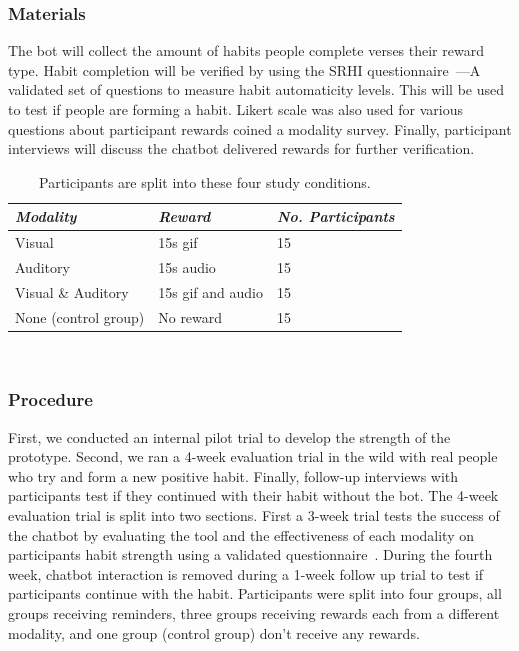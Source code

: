 \documentclass{scaffold/sigchi}
\begin{document}
\subsubsection{Materials}
The bot will collect the amount of habits people complete verses their reward type. Habit completion will be verified by using the SRHI questionnaire~\cite{article_habit_measurement}---A validated set of questions to measure habit automaticity levels. This will be used to test if people are forming a habit. Likert scale was also used for various questions about participant rewards coined a modality survey. Finally, participant interviews will discuss the chatbot delivered rewards for further verification.

\begin{table}
  \centering
  \begin{tabular}{l l l}
    {\small\textit{Modality}} & {\small \textit{Reward}} & {\small \textit{No. Participants}}\\
    \midrule
    Visual & 15s gif & 15 \\
    Auditory & 15s audio & 15 \\
    Visual \& Auditory & 15s gif and audio & 15 \\
    None (control group) & No reward & 15 \\
  \end{tabular}
  \caption{Participants are split into these four study conditions.}~\label{tab:precise_rewards}
\end{table}

\subsubsection{Procedure}
First, we conducted an internal pilot trial to develop the strength of the prototype. Second, we ran a 4-week evaluation trial in the wild with real people who try and form a new positive habit. Finally, follow-up interviews with participants test if they continued with their habit without the bot.\newline
\newline
The 4-week evaluation trial is split into two sections. First a 3-week trial tests the success of the chatbot by evaluating the tool and the effectiveness of each modality on participants habit strength using a validated questionnaire~\cite{article_habit_measurement}. During the fourth week, chatbot interaction is removed during a 1-week follow up trial to test if participants continue with the habit. Participants were split into four groups, all groups receiving reminders, three groups receiving rewards each from a different modality, and one group (control group) don't receive any rewards.
\end{document}
